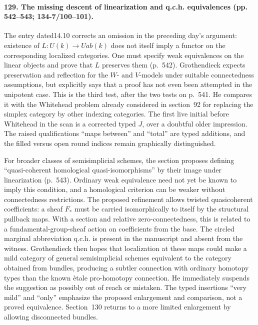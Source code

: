 \paragraph{129. The missing descent of linearization and q.c.h. equivalences (pp. 542--543; 134-7/100--101).}
The entry dated14.10 corrects an omission in the preceding day's argument: existence of $L:U(k)\to Uab(k)$ does not itself imply a functor on the corresponding localized categories. One must specify weak equivalences on the linear objects and prove that $L$ preserves them (p.~542). Grothendieck expects preservation and reflection for the $W$- and $V$-models under suitable connectedness assumptions, but explicitly says that a proof has not even been attempted in the unipotent case. This is the third test, after the two tests on p.~541. He compares it with the Whitehead problem already considered in section~92 for replacing the simplex category by other indexing categories. The first live initial before Whitehead in the scan is a corrected typed $J$, over a doubtful older impression. The raised qualifications ``maps between'' and ``total'' are typed additions, and the filled versus open round indices remain graphically distinguished.

For broader classes of semisimplicial schemes, the section proposes defining ``quasi-coherent homological quasi-isomorphisms'' by their image under linearization (p.~543). Ordinary weak equivalence need not yet be known to imply this condition, and a homological criterion can be weaker without connectedness restrictions. The proposed refinement allows twisted quasicoherent coefficients: a sheaf $F_*$ must be carried isomorphically to itself by the structural pullback maps. With a section and relative zero-connectedness, this is related to a fundamental-group-sheaf action on coefficients from the base. The circled marginal abbreviation q.c.h. is present in the manuscript and absent from the witness. Grothendieck then hopes that localization at these maps could make a mild category of general semisimplicial schemes equivalent to the category obtained from bundles, producing a subtler connection with ordinary homotopy types than the known \`etale pro-homotopy connection. He immediately suspends the suggestion as possibly out of reach or mistaken. The typed insertions ``very mild'' and ``only'' emphasize the proposed enlargement and comparison, not a proved equivalence. Section~130 returns to a more limited enlargement by allowing disconnected bundles.

